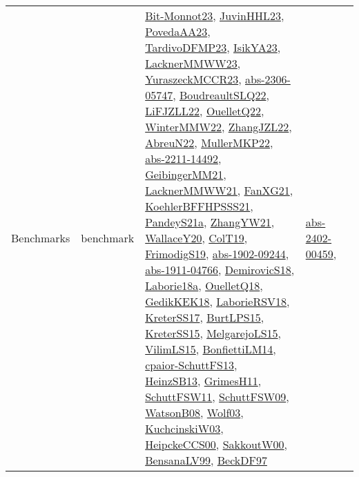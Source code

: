{\begin{longtable}{llp{6cm}p{6cm}p{6cm}}
Benchmarks & benchmark & \href{papers/Bit-Monnot23.pdf}{Bit-Monnot23}\cite{Bit-Monnot23}, \href{papers/JuvinHHL23.pdf}{JuvinHHL23}\cite{JuvinHHL23}, \href{papers/PovedaAA23.pdf}{PovedaAA23}\cite{PovedaAA23}, \href{papers/TardivoDFMP23.pdf}{TardivoDFMP23}\cite{TardivoDFMP23}, \href{articles/IsikYA23.pdf}{IsikYA23}\cite{IsikYA23}, \href{articles/LacknerMMWW23.pdf}{LacknerMMWW23}\cite{LacknerMMWW23}, \href{articles/YuraszeckMCCR23.pdf}{YuraszeckMCCR23}\cite{YuraszeckMCCR23}, \href{articles/abs-2306-05747.pdf}{abs-2306-05747}\cite{abs-2306-05747}, \href{papers/BoudreaultSLQ22.pdf}{BoudreaultSLQ22}\cite{BoudreaultSLQ22}, \href{papers/LiFJZLL22.pdf}{LiFJZLL22}\cite{LiFJZLL22}, \href{papers/OuelletQ22.pdf}{OuelletQ22}\cite{OuelletQ22}, \href{papers/WinterMMW22.pdf}{WinterMMW22}\cite{WinterMMW22}, \href{papers/ZhangJZL22.pdf}{ZhangJZL22}\cite{ZhangJZL22}, \href{articles/AbreuN22.pdf}{AbreuN22}\cite{AbreuN22}, \href{articles/MullerMKP22.pdf}{MullerMKP22}\cite{MullerMKP22}, \href{articles/abs-2211-14492.pdf}{abs-2211-14492}\cite{abs-2211-14492}, \href{papers/GeibingerMM21.pdf}{GeibingerMM21}\cite{GeibingerMM21}, \href{papers/LacknerMMWW21.pdf}{LacknerMMWW21}\cite{LacknerMMWW21}, \href{articles/FanXG21.pdf}{FanXG21}\cite{FanXG21}, \href{articles/KoehlerBFFHPSSS21.pdf}{KoehlerBFFHPSSS21}\cite{KoehlerBFFHPSSS21}, \href{articles/PandeyS21a.pdf}{PandeyS21a}\cite{PandeyS21a}, \href{articles/ZhangYW21.pdf}{ZhangYW21}\cite{ZhangYW21}, \href{articles/WallaceY20.pdf}{WallaceY20}\cite{WallaceY20}, \href{papers/ColT19.pdf}{ColT19}\cite{ColT19}, \href{papers/FrimodigS19.pdf}{FrimodigS19}\cite{FrimodigS19}, \href{articles/abs-1902-09244.pdf}{abs-1902-09244}\cite{abs-1902-09244}, \href{articles/abs-1911-04766.pdf}{abs-1911-04766}\cite{abs-1911-04766}, \href{papers/DemirovicS18.pdf}{DemirovicS18}\cite{DemirovicS18}, \href{papers/Laborie18a.pdf}{Laborie18a}\cite{Laborie18a}, \href{papers/OuelletQ18.pdf}{OuelletQ18}\cite{OuelletQ18}, \href{articles/GedikKEK18.pdf}{GedikKEK18}\cite{GedikKEK18}, \href{articles/LaborieRSV18.pdf}{LaborieRSV18}\cite{LaborieRSV18}, \href{articles/KreterSS17.pdf}{KreterSS17}\cite{KreterSS17}, \href{papers/BurtLPS15.pdf}{BurtLPS15}\cite{BurtLPS15}, \href{papers/KreterSS15.pdf}{KreterSS15}\cite{KreterSS15}, \href{papers/MelgarejoLS15.pdf}{MelgarejoLS15}\cite{MelgarejoLS15}, \href{papers/VilimLS15.pdf}{VilimLS15}\cite{VilimLS15}, \href{papers/BonfiettiLM14.pdf}{BonfiettiLM14}\cite{BonfiettiLM14}, \href{papers/cpaior-SchuttFS13.pdf}{cpaior-SchuttFS13}\cite{cpaior-SchuttFS13}, \href{articles/HeinzSB13.pdf}{HeinzSB13}\cite{HeinzSB13}, \href{papers/GrimesH11.pdf}{GrimesH11}\cite{GrimesH11}, \href{articles/SchuttFSW11.pdf}{SchuttFSW11}\cite{SchuttFSW11}, \href{papers/SchuttFSW09.pdf}{SchuttFSW09}\cite{SchuttFSW09}, \href{papers/WatsonB08.pdf}{WatsonB08}\cite{WatsonB08}, \href{papers/Wolf03.pdf}{Wolf03}\cite{Wolf03}, \href{articles/KuchcinskiW03.pdf}{KuchcinskiW03}\cite{KuchcinskiW03}, \href{articles/HeipckeCCS00.pdf}{HeipckeCCS00}\cite{HeipckeCCS00}, \href{articles/SakkoutW00.pdf}{SakkoutW00}\cite{SakkoutW00}, \href{articles/BensanaLV99.pdf}{BensanaLV99}\cite{BensanaLV99}, \href{papers/BeckDF97.pdf}{BeckDF97}\cite{BeckDF97} & \href{articles/abs-2402-00459.pdf}{abs-2402-00459}\cite{abs-2402-00459}, 
\end{longtable}}
